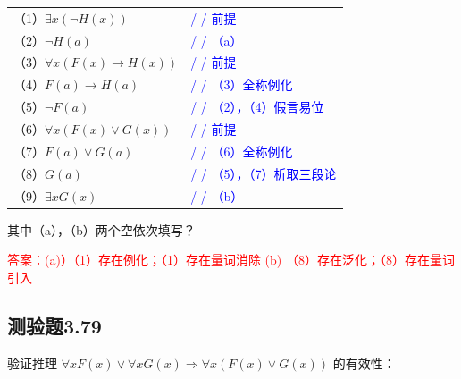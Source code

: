 \documentclass[UTF8, heading=true]{ctexart}
\begin{document}
\begin{table}[H]
  \centering
  \renewcommand{\arraystretch}{1.5}
\begin{tabular}{ll}
（1）$\exists x(\neg H(x))$ & \textcolor{blue}{/ / 前提} \\
（2）$\neg H(a)$ & \textcolor{blue}{/ / （a）} \\
（3）$\forall x(F(x) \rightarrow H(x))$ & \textcolor{blue}{/ / 前提} \\
（4）$F(a) \rightarrow H(a)$ & \textcolor{blue}{/ / （3）全称例化} \\
（5）$\neg F(a)$ & \textcolor{blue}{/ / （2），（4）假言易位} \\
（6）$\forall x(F(x) \vee G(x))$ & \textcolor{blue}{/ / 前提} \\
（7）$F(a) \vee G(a)$ & \textcolor{blue}{/ / （6）全称例化} \\
（8）$G(a)$ & \textcolor{blue}{/ / （5），（7）析取三段论} \\
（9）$\exists x G(x)$ & \textcolor{blue}{/ / （b）}
\end{tabular}
\end{table}

其中（a），（b）两个空依次填写？

\textcolor{red}{答案：(a)）（1）存在例化；（1）存在量词消除 (b) （8）存在泛化；（8）存在量词引入}
\subsection{测验题3.79}


验证推理 $\forall x F(x) \vee \forall x G(x) \Longrightarrow \forall x(F(x) \vee G(x))$ 的有效性：
\end{document}
